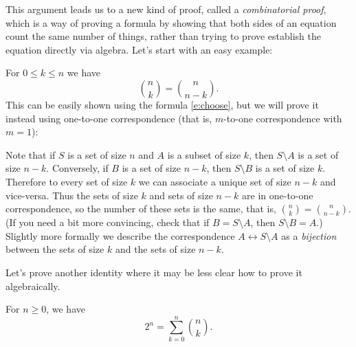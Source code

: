 \documentclass[11pt,dvipsnames]{book}
\numberwithin{equation}{section} %
\numberwithin{figure}{section} %
\numberwithin{table}{section} %
\begin{document}

\medskip
This argument leads us to a new kind of proof, called a {\it combinatorial proof}, which is a way of proving a formula by showing that both sides of an equation count the same number of things, rather than trying to prove establish the equation directly via algebra. Let's start with an easy example:



\begin{example}
For $0 \leq k \leq n$ we have 
\[
{n\choose k} = {n \choose n-k}.
\]
This can be easily shown using the formula \eqref{e:choose}, but we will prove it instead using one-to-one correspondence (that is, $m$-to-one correspondence with $m=1$):

Note that if $S$ is a set of size $n$ and $A$ is a subset of size $k$, then $S\setminus A$ is a set of size $n-k$. Conversely, if $B$ is a set of size $n-k$, then $S \setminus B$ is a set of size $k$. 
Therefore to every set of size $k$ we can associate a unique set of size $n-k$ and vice-versa. Thus the sets of size $k$ and sets of size $n-k$ are in one-to-one correspondence, so the number of these sets is the same, that is, ${n\choose k} = {n \choose n-k}$. 
(If you need a bit more convincing, check that if
$B = S \setminus A$, then $S \setminus B = A$.) Slightly more formally we describe the correspondence $A \leftrightarrow S \setminus A$ as a {\em bijection} between the sets of size $k$ and the sets of size $n-k$.

\end{example}


Let's prove another identity where it may be less clear how to prove it algebraically.

\begin{corollary}
\label{c:2^n=nk}
For $n\geq 0$, we have 
\[
2^{n} = \sum_{k=0}^{n} {n\choose k}
.\]
\end{corollary}
\end{document}
